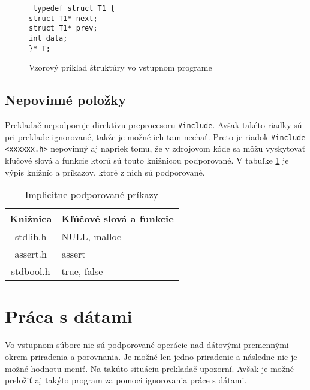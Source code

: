 \begin{center}
\begin{figure}
\texttt{
typedef struct T1 \{\\                                                            
\tab struct T1* next;\\                                                            
\tab struct T1* prev;\\                                                          
\tab int data;\\                                                                   
\}* T;
}

\label{fig:struct}
\caption{Vzorový príklad štruktúry vo vstupnom programe}
\end{figure}
\end{center}

\subsection{Nepovinné položky}
Prekladač nepodporuje direktívu preprocesoru \texttt{\#include}. Avšak takéto riadky sú pri preklade ignorované, takže je možné ich tam nechať. Preto je riadok \texttt{\#include <xxxxxx.h>} nepovinný aj napriek tomu, že v zdrojovom kóde sa môžu vyskytovať kľučové slová a funkcie ktorú sú touto knižnicou podporované. V tabuľke \ref{table:kniz} je výpis knižníc a príkazov, ktoré z nich sú podporované.

\begin{table}[]
\centering
\caption{Implicitne podporované príkazy}
\label{table:kniz}
\begin{tabular}{|c|l|}
\hline
\textbf{Knižnica} & \textbf{Kľúčové slová a  funkcie} \\ \hline
stdlib.h          & NULL, malloc                      \\ \hline
assert.h          & assert                            \\ \hline
stdbool.h         & true, false                       \\ \hline
\end{tabular}
\end{table}


\section{Práca s dátami}
\label{sec_data}
Vo vstupnom súbore nie sú podporované operácie nad dátovými premennými okrem priradenia a porovnania. Je možné len jedno priradenie a následne nie je možné hodnotu meniť. Na takúto situáciu prekladač upozorní. Avšak je možné preložiť aj takýto program za pomoci ignorovania práce s dátami.

